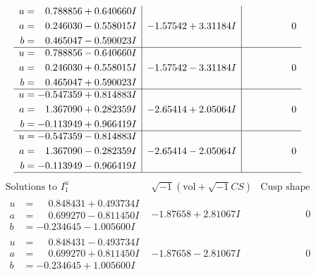 \documentclass[1p]{elsarticle_modified}
\theoremstyle{definition}
\newcommand{\I}{\sqrt{-1}}
\begin{document}
$$\begin{array}{c|c|c}
\begin{aligned}
u &= \phantom{-}0.788856 + 0.640660 I \\
a &= \phantom{-}0.246030 - 0.558015 I \\
b &= \phantom{-}0.465047 - 0.590023 I\end{aligned}
 & -1.57542 + 3.31184 I & \phantom{-0.000000 } 0 \\ \hline\begin{aligned}
u &= \phantom{-}0.788856 - 0.640660 I \\
a &= \phantom{-}0.246030 + 0.558015 I \\
b &= \phantom{-}0.465047 + 0.590023 I\end{aligned}
 & -1.57542 - 3.31184 I & \phantom{-0.000000 } 0 \\ \hline\begin{aligned}
u &= -0.547359 + 0.814883 I \\
a &= \phantom{-}1.367090 + 0.282359 I \\
b &= -0.113949 + 0.966419 I\end{aligned}
 & -2.65414 + 2.05064 I & \phantom{-0.000000 } 0 \\ \hline\begin{aligned}
u &= -0.547359 - 0.814883 I \\
a &= \phantom{-}1.367090 - 0.282359 I \\
b &= -0.113949 - 0.966419 I\end{aligned}
 & -2.65414 - 2.05064 I & \phantom{-0.000000 } 0\\
 \hline 
 \end{array}$$\newpage$$\begin{array}{c|c|c}  
\text{Solutions to }I^u_{1}& \I (\text{vol} + \sqrt{-1}CS) & \text{Cusp shape}\\
 \hline 
\begin{aligned}
u &= \phantom{-}0.848431 + 0.493734 I \\
a &= \phantom{-}0.699270 - 0.811450 I \\
b &= -0.234645 - 1.005600 I\end{aligned}
 & -1.87658 + 2.81067 I & \phantom{-0.000000 } 0 \\ \hline\begin{aligned}
u &= \phantom{-}0.848431 - 0.493734 I \\
a &= \phantom{-}0.699270 + 0.811450 I \\
b &= -0.234645 + 1.005600 I\end{aligned}
 & -1.87658 - 2.81067 I & \phantom{-0.000000 } 0 \\ \hline\begin{aligned}

\end{aligned}
\end{array}$$
\end{document}
